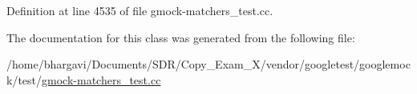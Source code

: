 Definition at line 4535 of file gmock-\/matchers\+\_\+test.\+cc.



The documentation for this class was generated from the following file\+:\begin{DoxyCompactItemize}
\item 
/home/bhargavi/\+Documents/\+S\+D\+R/\+Copy\+\_\+\+Exam\+\_\+X/vendor/googletest/googlemock/test/\hyperlink{gmock-matchers__test_8cc}{gmock-\/matchers\+\_\+test.\+cc}\end{DoxyCompactItemize}
